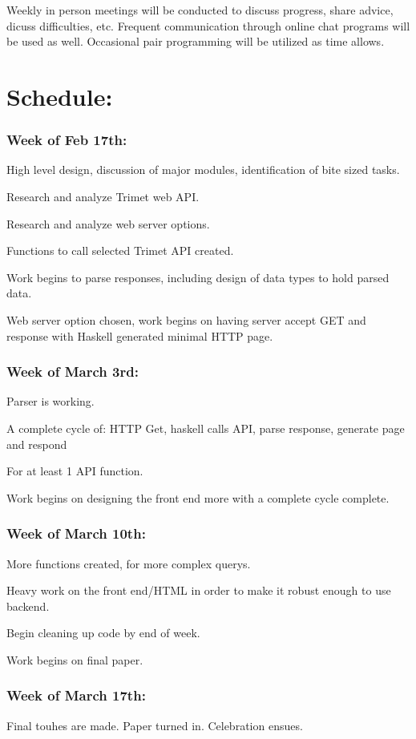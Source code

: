 \documentclass{article}
\begin{document}
Weekly in person meetings will be conducted to discuss progress, share advice, dicuss
difficulties, etc.  Frequent communication through online chat programs will be
used as well.  Occasional pair programming will be utilized as time allows.  

\section*{Schedule: }
\subsubsection*{Week of Feb 17th:}
High level design, discussion of major modules, identification of bite sized tasks.

Research and analyze Trimet web API.

Research and analyze web server options.

Functions to call selected Trimet API created.

Work begins to parse responses, including design of data types to hold parsed data.

Web server option chosen, work begins on having server accept GET and response
with Haskell generated minimal HTTP page.

\subsubsection*{Week of March 3rd:}
Parser is working.

A complete cycle of: HTTP Get, haskell calls API, parse response, generate page and respond

For at least 1 API function.  

Work begins on designing the front end more with a complete cycle complete.

\subsubsection*{Week of March 10th:}
More functions created, for more complex querys.

Heavy work on the front end/HTML in order to make it robust enough to use backend.

Begin cleaning up code by end of week.

Work begins on final paper.
\subsubsection*{Week of March 17th:}
Final touhes are made.  Paper turned in.  Celebration ensues.
\end{document}
